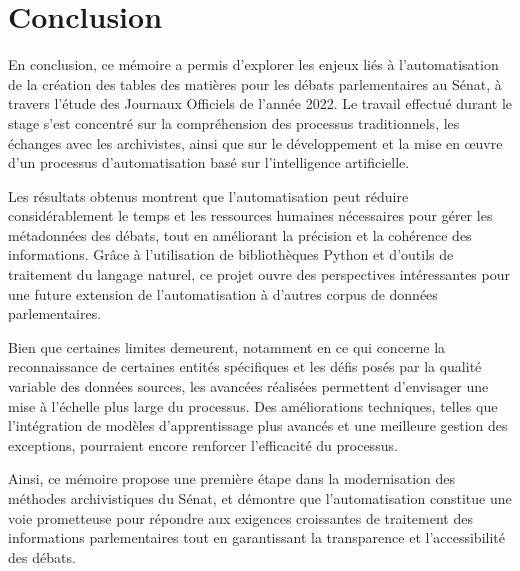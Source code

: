 \chapter*{Conclusion}
\label{sec:conclusion}
En conclusion, ce mémoire a permis d’explorer les enjeux liés à l’automatisation de la création des tables des matières pour les débats parlementaires au Sénat, à travers l’étude des Journaux Officiels de l’année 2022. Le travail effectué durant le stage s’est concentré sur la compréhension des processus traditionnels, les échanges avec les archivistes, ainsi que sur le développement et la mise en œuvre d’un processus d’automatisation basé sur l’intelligence artificielle.

Les résultats obtenus montrent que l’automatisation peut réduire considérablement le temps et les ressources humaines nécessaires pour gérer les métadonnées des débats, tout en améliorant la précision et la cohérence des informations. Grâce à l’utilisation de bibliothèques Python et d’outils de traitement du langage naturel, ce projet ouvre des perspectives intéressantes pour une future extension de l’automatisation à d’autres corpus de données parlementaires.

Bien que certaines limites demeurent, notamment en ce qui concerne la reconnaissance de certaines entités spécifiques et les défis posés par la qualité variable des données sources, les avancées réalisées permettent d’envisager une mise à l’échelle plus large du processus. Des améliorations techniques, telles que l’intégration de modèles d’apprentissage plus avancés et une meilleure gestion des exceptions, pourraient encore renforcer l’efficacité du processus.

Ainsi, ce mémoire propose une première étape dans la modernisation des méthodes archivistiques du Sénat, et démontre que l’automatisation constitue une voie prometteuse pour répondre aux exigences croissantes de traitement des informations parlementaires tout en garantissant la transparence et l’accessibilité des débats.